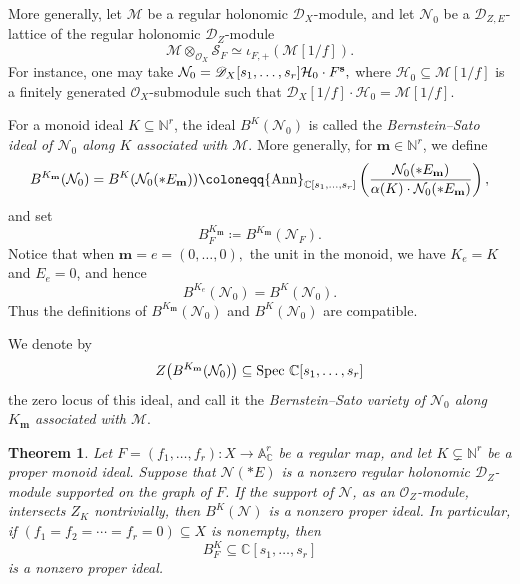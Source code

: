 \documentclass{amsart}
\theoremstyle{plain}
\newtheorem{theorem}{Theorem}
\numberwithin{theorem}{section}
\theoremstyle{definition}
\theoremstyle{remark}
\theoremstyle{definition}
\newcommand{\A}{\mathbb{A}}
\newcommand{\C}{\mathbb{C}} %
\newcommand{\N}{\mathbb{N}}
\newcommand{\cH}{\mathcal{H}}
\newcommand{\cM}{\mathcal{M}}
\newcommand{\cN}{\mathcal{N}}
\newcommand{\cO}{\mathscr{O}}
\newcommand{\cS}{\mathcal{S}}
\newcommand{\bm}{\mathbf{m}}
\newcommand{\shD}{\mathscr{D}}
\newcommand{\Spec}{\textup{Spec }}
\newcommand{\bs}{{\bf s}}
\newcommand{\Ann}{{\textup{Ann}}}
\begin{document}
More generally, let $\cM$ be a regular holonomic $\shD_X$-module, and let
$\cN_0$ be a $\shD_{Z,E}$-lattice of the regular holonomic $\shD_Z$-module
\[
\cM\otimes_{\cO_X}\cS_F
\simeq
\iota_{F,+}(\cM[1/f]).
\]
For instance, one may take
$\cN_0
=
\shD_X[s_1,\dots,s_r]\cH_0\cdot F^\bs,$
where $\cH_0\subseteq \cM[1/f]$ is a finitely generated $\cO_X$-submodule
such that
$\shD_X[1/f]\cdot \cH_0=\cM[1/f].$

For a monoid ideal $K\subseteq \N^r$, the ideal $B^K(\cN_0)$ is called the
\emph{Bernstein--Sato ideal of $\cN_0$ along $K$ associated with $\cM$}.
More generally, for $\bm\in \N^r$, we define
\[
B^{K_\bm}(\cN_0)
=
B^K(\cN_0(*E_\bm))
\coloneqq
\Ann_{\C[s_1,\dots,s_r]}
\left(
\frac{\cN_0(*E_\bm)}
{\alpha(K)\cdot \cN_0(*E_\bm)}
\right),
\]
and set
\[
B_F^{K_\bm}
\coloneqq
B^{K_\bm}(\cN_F).
\]
Notice that when
$\bm=e=(0,\dots,0),$
the unit in the monoid,
we have $K_e=K$ and $E_e=0$, and hence
\[
B^{K_e}(\cN_0)=B^K(\cN_0).
\]
Thus the definitions of $B^{K_\bm}(\cN_0)$ and $B^K(\cN_0)$ are compatible.

We denote by
\[
Z\big(B^{K_\bm}(\cN_0)\big)
\subseteq
\Spec \C[s_1,\dots,s_r]
\]
the zero locus of this ideal, and call it the \emph{Bernstein--Sato variety
of $\cN_0$ along $K_\bm$ associated with $\cM$}.

\begin{theorem}\label{thm:nozeroproperBSI}
Let
$F=(f_1,\dots,f_r)\colon X\to \A_\C^r$
be a regular map, and let $K\subsetneq \N^r$ be a proper monoid ideal. Suppose
that $\cN(*E)$ is a nonzero regular holonomic $\shD_Z$-module supported on the
graph of $F$. If the support of $\cN$, as an $\cO_Z$-module, intersects
$Z_K$ nontrivially, then $B^K(\cN)$ is a nonzero proper ideal. In particular,
if
$(f_1=f_2=\cdots=f_r=0)\subseteq X$
is nonempty, then
\[
B_F^K\subseteq \C[s_1,\dots,s_r]
\]
is a nonzero proper ideal.
\end{theorem}
\end{document}
